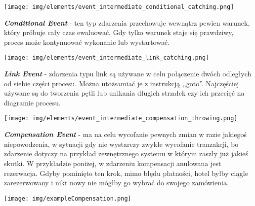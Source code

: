 \documentclass[declaration,shortabstract,mgr]{iithesis}
\begin{document}
\vspace{\mypointsep}

\noindent\begin{minipage}[t]{0.075\textwidth}\vspace{0pt}
\texttt{[image: img/elements/event\_intermediate\_conditional\_catching.png]}
\end{minipage}\hfill
\begin{minipage}[t]{0.875\textwidth}\vspace{0pt}
\textbf{\textit{Conditional Event}} - ten typ zdarzenia przechowuje wewnątrz pewien warunek, który próbuje cały czas ewaluować. Gdy tylko warunek staje się prawdziwy, proces może kontynuować wykonanie lub wystartować.
\end{minipage}

\vspace{\mypointsep}

\noindent\begin{minipage}[t]{0.075\textwidth}\vspace{0pt}
\texttt{[image: img/elements/event\_intermediate\_link\_catching.png]}
\end{minipage}\hfill
\begin{minipage}[t]{0.875\textwidth}\vspace{0pt}
\textbf{\textit{Link Event}} - zdarzenia typu link są używane w celu połączenie dwóch odległych od siebie części procesu. Można utożsamiać je z instrukcją ,,goto''. Najczęściej używane są do tworzenia pętli lub unikania długich strzałek czy ich przecięć na diagramie procesu.
\end{minipage}

\vspace{\mypointsep}

\noindent\begin{minipage}[t]{0.075\textwidth}\vspace{0pt}
\texttt{[image: img/elements/event\_intermediate\_compensation\_throwing.png]}
\end{minipage}\hfill
\begin{minipage}[t]{0.875\textwidth}\vspace{0pt}
\textbf{\textit{Compensation Event}} - ma na celu wycofanie pewnych zmian w razie jakiegoś niepowodzenia, w sytuacji gdy nie wystarczy zwykłe wycofanie tranzakcji, bo zdarzenie dotyczy na przykład zewnętrznego systemu w którym zaszły już jakieś skutki. W przykładzie poniżej, w zdarzeniu kompensacji anulowana jest rezerwacja. Gdyby pominięto ten krok, mimo błędu płatności, hotel byłby ciągle zarezerwowany i nikt nowy nie mógłby go wybrać do swojego zamówienia.
\begin{center}
\texttt{[image: img/exampleCompensation.png]}
\end{center}
\end{minipage}
\end{document}
